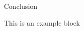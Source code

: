 \begin{frame}{Conclusion}
    \begin{exampleblock}{This is an example block}
        \lipsum[5][1-3]
    \end{exampleblock}
\end{frame}